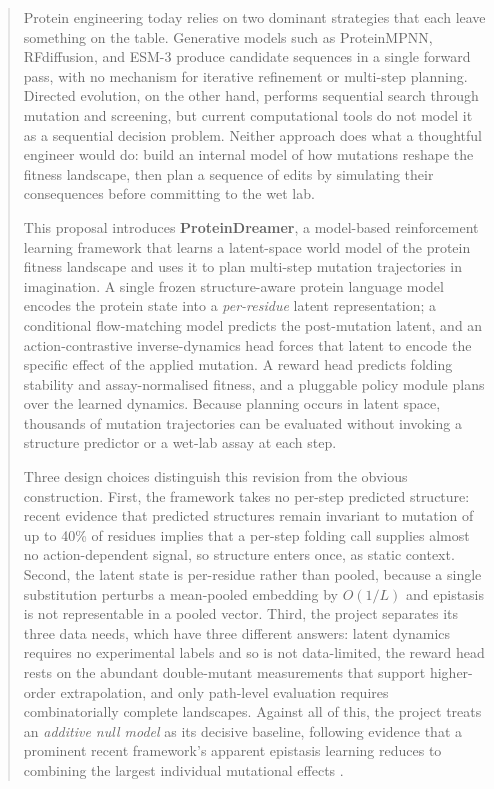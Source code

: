 \documentclass[12pt, a4paper]{article}
\begin{document}
\begin{abstract}
Protein engineering today relies on two dominant strategies that each leave something on the table. Generative models such as ProteinMPNN, RFdiffusion, and ESM-3 produce candidate sequences in a single forward pass, with no mechanism for iterative refinement or multi-step planning. Directed evolution, on the other hand, performs sequential search through mutation and screening, but current computational tools do not model it as a sequential decision problem. Neither approach does what a thoughtful engineer would do: build an internal model of how mutations reshape the fitness landscape, then plan a sequence of edits by simulating their consequences before committing to the wet lab.

This proposal introduces \textbf{ProteinDreamer}, a model-based reinforcement learning framework that learns a latent-space world model of the protein fitness landscape and uses it to plan multi-step mutation trajectories in imagination. A single frozen structure-aware protein language model encodes the protein state into a \textit{per-residue} latent representation; a conditional flow-matching model predicts the post-mutation latent, and an action-contrastive inverse-dynamics head forces that latent to encode the specific effect of the applied mutation. A reward head predicts folding stability and assay-normalised fitness, and a pluggable policy module plans over the learned dynamics. Because planning occurs in latent space, thousands of mutation trajectories can be evaluated without invoking a structure predictor or a wet-lab assay at each step.

Three design choices distinguish this revision from the obvious construction. First, the framework takes no per-step predicted structure: recent evidence that predicted structures remain invariant to mutation of up to 40\% of residues \citep{feldman2026invariance} implies that a per-step folding call supplies almost no action-dependent signal, so structure enters once, as static context. Second, the latent state is per-residue rather than pooled, because a single substitution perturbs a mean-pooled embedding by $O(1/L)$ and epistasis is not representable in a pooled vector. Third, the project separates its three data needs, which have three different answers: latent dynamics requires no experimental labels and so is not data-limited, the reward head rests on the abundant double-mutant measurements that support higher-order extrapolation, and only path-level evaluation requires combinatorially complete landscapes. Against all of this, the project treats an \textit{additive null model} as its decisive baseline, following evidence that a prominent recent framework's apparent epistasis learning reduces to combining the largest individual mutational effects \citep{visani2026additive}.


\end{abstract}
\end{document}
